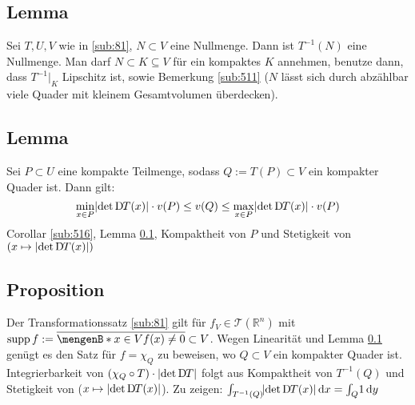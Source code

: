 \subsection[Lemma: Urbild einer Nullmenge unter einen $C^1$-Diffeomorphismus]{Lemma} %
\label{sub:82}
Sei $T, U,V$ wie in \ref{sub:81}, $N \subset V$ eine Nullmenge. Dann ist $T ^{-1}(N)$ eine Nullmenge.
Man darf $N \subset K \subseteq V$ für ein kompaktes $K$ annehmen, benutze dann, dass $T ^{-1}\big|_K$ Lipschitz ist, sowie Bemerkung \ref{sub:511} ($N$ lässt sich durch
abzählbar viele Quader mit kleinem Gesamtvolumen überdecken). \bewende

\subsection[Lemma: Abschätzungen für das Volumen eines Quaders mit kompaktem Urbild]{Lemma} %
\label{sub:83}
Sei $P \subset U$ eine kompakte Teilmenge, sodass $Q := T(P) \subset V$ ein kompakter Quader ist. Dann gilt:
\[
	\min_{x \in P} \lvert\det \mathrm{D}\mkern-1.5mu T(x)\rvert \cdot v(P) \le v(Q)\le \max_{x \in P} \lvert\det \mathrm{D}\mkern-1.5mu T(x)\rvert \cdot v(P)
\]
Corollar \ref{sub:516}, Lemma \ref{sub:82}, Kompaktheit von $P$ und Stetigkeit von $( x \mapsto \lvert\det \mathrm{D}\mkern-1.5mu T(x)\rvert )$ \bewende

\subsection[Proposition: Transformationssatz für Treppenfunktionen]{Proposition} %
\label{sub:84}
Der Transformationssatz \ref{sub:81} gilt für $f_V \in \mathcal{T}(\mathds{R}^n) $ mit $\supp f := \overline{\set[x \in V]{f(x)\not= 0}} \subset V $.
Wegen Linearität  und Lemma \ref{sub:82} genügt es den Satz für $f = \chi_Q$ zu beweisen, wo $Q \subset V$ ein kompakter Quader ist.
Integrierbarkeit von $(\chi_Q \circ T) \cdot \lvert\det \mathrm{D}\mkern-1.5mu T\rvert $ folgt aus Kompaktheit von $T ^{-1}(Q)$ und Stetigkeit von ($x \mapsto \lvert\det \mathrm{D}\mkern-1.5mu T(x)\rvert $).
Zu zeigen: $\int_{T ^{-1}(Q)}\! \lvert\det \mathrm{D}\mkern-1.5mu T(x)\rvert  \, \mathrm{d}x  = \int_Q\! 1  \, \mathrm{d}y $


